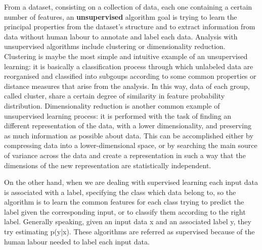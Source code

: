 \documentclass[a4paper,11pt]{article}
\begin{document}
From a dataset, consisting on a collection of data, each one containing a certain number of features, an \textbf{unsupervised} algorithm goal is trying to learn the principal properties from the dataset's structure and to extract information from data without human labour to annotate and label each data.
Analysis with unsupervised algorithms include clustering or dimensionality reduction.
Clustering is maybe the most simple and intuitive example of an unsupervised learning: it is basically a classification process through which unlabeled data are reorganised and classified into subgoups according to some common properties or distance measures that arise from the analysis.
In this way, data of each group, called cluster, share a certain degree of similarity in feature probability distribution.
Dimensionality reduction is another common example of unsupervised learning process: it is performed with the task of finding an different representation of the data, with a lower dimensionality, and preserving as much information as possible about data.
This can be accomplished either by compressing data into a lower-dimensional space, or by searching the main source of variance across the data and create a representation in such a way that the dimensions of the new representation are statistically independent.




On the other hand, when we are dealing with supervised learning each input data is associated with a label, specifying the class which data belong to, so the algorithm is to learn the common features for each class trying to predict the label given the corresponding input, or to classify them according to the right label.
Generally speaking, given an input data x and an associated label y, they try estimating p(y|x). These algorithms are referred as supervised because of the human labour needed to label each input data.
\end{document}
